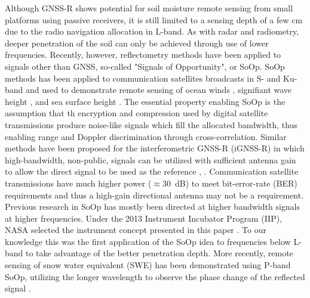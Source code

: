 \documentclass[draftcls,onecolumn]{IEEEtran}  %
\begin{document}
Although GNSS-R shows potential for soil moisture remote sensing from small platforms using passive receivers, it is still limited to a sensing depth of a few cm due to the radio navigation allocation in L-band.  
As with radar and radiometry, deeper penetration of the soil can only be achieved through use of lower frequencies. 
Recently, however, reflectometry methods have been applied to signals other than GNSS,
so-called "Signals of Opportunity", or SoOp. 
SoOp methods has been applied to communication satellites broadcasts in S-  and Ku-band and used to demonstrate remote sensing of ocean winds \cite{Shah}, signifiant wave height \cite{Shaha}, \cite{Shah2016} and sea surface height \cite{shahthesis2014}. 
The essential property enabling SoOp is the assumption that th encryption and compression  used by digital satellite transmissions produce noise-like signals which fill the allocated bandwidth, thus enabling range and Doppler discrimination through cross-correlation. 
Similar methods have been proposed for the interferometric GNSS-R (iGNSS-R) in which high-bandwidth, non-public, signals can be utilized with sufficient antenna gain to allow the direct signal to be used as the reference \cite{Martin2014a}, \cite{Camps2014}. 
Communication satellite transmissions have much higher power ($\approx$30~dB) to meet bit-error-rate (BER) requirements and thus a high-gain directional antenna may not be a requirement. 
Previous research in SoOp has mostly been directed at higher bandwidth signals at higher frequencies. 
Under the 2013 Instrument Incubator Program (IIP), NASA selected the instrument concept presented in this paper 
\cite{JosephKnuble1JeffreyPiepmeier1ManoharDeshpande1CornelusDuToit22016}. 
To our knowledge this was the first application of the SoOp idea to frequencies below L-band to take advantage of the better penetration depth. 
More recently, remote sensing of snow water equivalent (SWE) has been demonstrated using P-band SoOp, utilizing the longer wavelength to observe the phase change 
of the reflected signal \cite{Shahb}.
\end{document}
